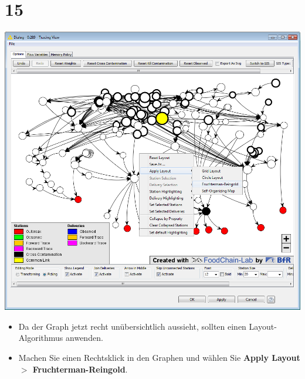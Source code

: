 \documentclass{beamer}
\begin{document}
\section{15}
\begin{frame}
	\begin{center}
  		\includegraphics[height=0.6\textheight]{15.png}
	\end{center}
	\begin{itemize}
		\item Da der Graph jetzt recht unübersichtlich aussieht, sollten einen Layout-Algorithmus anwenden.
		\item Machen Sie einen Rechtsklick in den Graphen und wählen Sie \textbf{Apply Layout $>$ Fruchterman-Reingold}.
	\end{itemize}
\end{frame}
\end{document}
